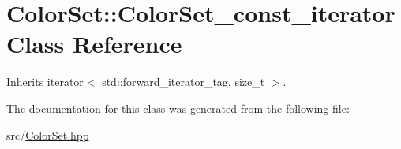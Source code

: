 \hypertarget{classColorSet_1_1ColorSet__const__iterator}{}\section{Color\+Set\+:\+:Color\+Set\+\_\+const\+\_\+iterator Class Reference}
\label{classColorSet_1_1ColorSet__const__iterator}


Inherits iterator$<$ std\+::forward\+\_\+iterator\+\_\+tag, size\+\_\+t $>$.



The documentation for this class was generated from the following file\+:\begin{DoxyCompactItemize}
\item 
src/\hyperlink{ColorSet_8hpp}{Color\+Set.\+hpp}\end{DoxyCompactItemize}
